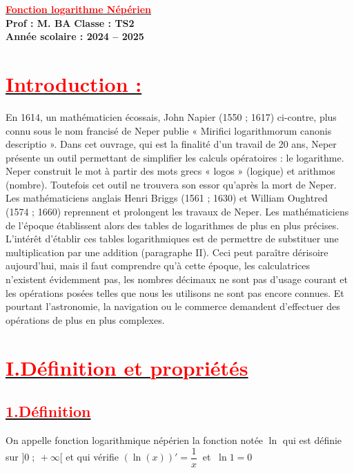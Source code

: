 \documentclass[12pt,a4paper]{article}
\begin{document}
\begin{center}
    \Large\textbf{\underline{\textcolor{red}{Fonction logarithme Népérien}}}\\[-0.1cm]
    \normalsize\textbf{Prof : M. BA} \hfill \textbf{Classe : TS2}\\[-0.1cm]
    \textbf{Année scolaire : 2024 -- 2025}
\end{center}


\section*{\underline{\textbf{\textcolor{red}{Introduction :}}}}

En 1614, un mathématicien écossais, John Napier (1550 ; 1617) ci-contre, plus connu sous le nom francisé de Neper publie « Mirifici logarithmorum canonis descriptio ».
Dans cet ouvrage, qui est la finalité d’un travail de 20 ans, Neper présente un outil permettant de simplifier les calculs opératoires : le logarithme.
Neper construit le mot à partir des mots grecs « logos » (logique) et arithmos (nombre).
Toutefois cet outil ne trouvera son essor qu’après la mort de Neper. Les mathématiciens anglais Henri Briggs (1561 ; 1630) et William Oughtred (1574 ; 1660) reprennent et prolongent les travaux de Neper.
Les mathématiciens de l’époque établissent alors des tables de logarithmes de plus en plus précises.
L’intérêt d’établir ces tables logarithmiques est de permettre de substituer une multiplication par une addition (paragraphe II). Ceci peut paraître dérisoire aujourd’hui, mais il faut comprendre qu’à cette époque, les calculatrices n’existent évidemment pas, les nombres décimaux ne sont pas d’usage courant et les opérations posées telles que nous les utilisons ne sont pas encore connues. Et pourtant l'astronomie, la navigation ou le commerce demandent d’effectuer des opérations de plus en plus complexes.

\section*{\underline{\textbf{\textcolor{red}{I.Définition et propriétés}}}}
\subsection*{\underline{\textbf{\textcolor{red}{1.Définition}}}}
On appelle fonction logarithmique népérien la fonction notée $\ln$ qui est définie sur $]0\;;\ +\infty[$ et qui vérifie $(\ln (x))'=\dfrac{1}{x}\ $ et $\ \ln 1=0$
\end{document}
